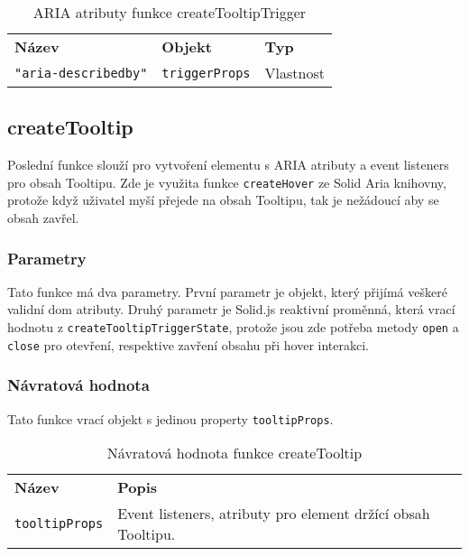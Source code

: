 \begin{table}[ht]
    \begin{ctucolortab}
        \begin{tabularx}{\textwidth}{X X X}
            \bfseries Název             & \bfseries Objekt      & \bfseries Typ \\\Midrule{}
            \texttt{"aria-describedby"} & \texttt{triggerProps} & Vlastnost
        \end{tabularx}
    \end{ctucolortab}
    \caption{ARIA atributy funkce createTooltipTrigger}
    \label{table:tooltip-trigger-aria}
\end{table}

\subsection{createTooltip}

Poslední funkce slouží pro vytvoření elementu s ARIA atributy a event listeners pro obsah Tooltipu.
Zde je využita funkce \texttt{createHover} ze Solid Aria knihovny, protože když uživatel myší přejede na obsah Tooltipu, tak je nežádoucí aby se obsah zavřel.

\subsubsection{Parametry}

Tato funkce má dva parametry.
První parametr je objekt, který přijímá veškeré validní \gls{dom} atributy.
Druhý parametr je Solid.js reaktivní proměnná, která vrací hodnotu z \texttt{createTooltipTriggerState}, protože jsou zde potřeba metody \texttt{open} a \texttt{close} pro otevření, respektive zavření obsahu při hover interakci.

\subsubsection{Návratová hodnota}

Tato funkce vrací objekt s jedinou property \texttt{tooltipProps}.

\begin{table}[ht]
    \begin{ctucolortab}
        \begin{tabularx}{\textwidth}{p{3cm} X}
            \bfseries Název       & \bfseries Popis                                              \\\Midrule{}
            \texttt{tooltipProps} & Event listeners, atributy pro element držící obsah Tooltipu.
        \end{tabularx}
    \end{ctucolortab}
    \caption{Návratová hodnota funkce createTooltip}
    \label{table:tooltip-return}
\end{table}

